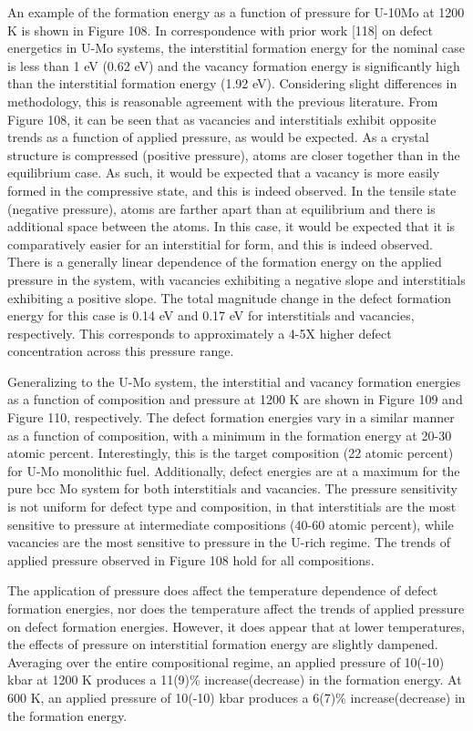 \documentclass[default]{sn-jnl}%
\begin{document}
An example of the formation energy as a function of pressure for U-10Mo at 1200 K is shown in Figure 108. In correspondence with prior work [118] on defect energetics in U-Mo systems, the interstitial formation energy for the nominal case is less than 1 eV (0.62 eV) and the vacancy formation energy is significantly high than the interstitial formation energy (1.92 eV). Considering slight differences in methodology, this is reasonable agreement with the previous literature. From Figure 108, it can be seen that as vacancies and interstitials exhibit opposite trends as a function of applied pressure, as would be expected. As a crystal structure is compressed (positive pressure), atoms are closer together than in the equilibrium case. As such, it would be expected that a vacancy is more easily formed in the compressive state, and this is indeed observed. In the tensile state (negative pressure), atoms are farther apart than at equilibrium and there is additional space between the atoms. In this case, it would be expected that it is comparatively easier for an interstitial for form, and this is indeed observed. There is a generally linear dependence of the formation energy on the applied pressure in the system, with vacancies exhibiting a negative slope and interstitials exhibiting a positive slope. The total magnitude change in the defect formation energy for this case is 0.14 eV and 0.17 eV for interstitials and vacancies, respectively. This corresponds to approximately a 4-5X higher defect concentration across this pressure range. 

Generalizing to the U-Mo system, the interstitial and vacancy formation energies as a function of composition and pressure at 1200 K are shown in Figure 109 and Figure 110, respectively. The defect formation energies vary in a similar manner as a function of composition, with a minimum in the formation energy at 20-30 atomic percent. Interestingly, this is the target composition (22 atomic percent) for U-Mo monolithic fuel. Additionally, defect energies are at a maximum for the pure bcc Mo system for both interstitials and vacancies. The pressure sensitivity is not uniform for defect type and composition, in that interstitials are the most sensitive to pressure at intermediate compositions (40-60 atomic percent), while vacancies are the most sensitive to pressure in the U-rich regime. The trends of applied pressure observed in Figure 108 hold for all compositions. 

The application of pressure does affect the temperature dependence of defect formation energies, nor does the temperature affect the trends of applied pressure on defect formation energies. However, it does appear that at lower temperatures, the effects of pressure on interstitial formation energy are slightly dampened. Averaging over the entire compositional regime, an applied pressure of 10(-10) kbar at 1200 K produces a 11(9)\% increase(decrease) in the formation energy. At 600 K, an applied pressure of 10(-10) kbar produces a 6(7)\% increase(decrease) in the formation energy. 
\end{document}
